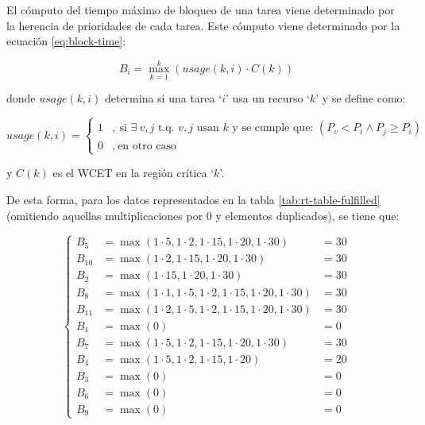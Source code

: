 El cómputo del tiempo máximo de bloqueo de una tarea viene determinado por la herencia
de prioridades de cada tarea. Este cómputo viene determinado por la ecuación \ref{eq:block-time}:

\begin{equation}\label{eq:block-time}
  B_i = \max_{k = 1}^k \left(usage\left(k, i\right) \cdot C\left(k\right)\right)
\end{equation}

donde $usage\left(k, i\right)$ determina si una tarea `$i$' usa un recurso `$k$'
y se define como:

\begin{equation*}
  usage\left(k, i\right) = \left\{
  \begin{aligned}
    1 & ,~\text{si $\exists~v,j$ t.q. $v,j$ usan $k$ y se cumple que: } \left(P_v < P_i \land P_j \ge P_i\right) \\
    0 & ,~\text{en otro caso}
  \end{aligned}
  \right.
\end{equation*}

y $C\left(k\right)$ es el \ac{WCET} en la región crítica `$k$'.

De esta forma, para los datos representados en la tabla \ref{tab:rt-table-fulfilled}
(omitiendo aquellas multiplicaciones por $0$ y elementos duplicados), se tiene que:

\begin{equation*}
  \left\{
  \begin{aligned}
    B_{5}  & = \max\left(1 \cdot 5, 1 \cdot 2, 1 \cdot 15, 1 \cdot 20, 1 \cdot 30\right)            & = 30 \\
    B_{10} & = \max\left(1 \cdot 2, 1 \cdot 15, 1 \cdot 20, 1 \cdot 30\right)                       & = 30 \\
    B_{2}  & = \max\left(1 \cdot 15, 1 \cdot 20, 1 \cdot 30\right)                                  & = 30 \\
    B_{8}  & = \max\left(1 \cdot 1, 1 \cdot 5, 1 \cdot 2, 1 \cdot 15, 1 \cdot 20, 1 \cdot 30\right) & = 30 \\
    B_{11} & = \max\left(1 \cdot 2, 1 \cdot 5, 1 \cdot 2, 1 \cdot 15, 1 \cdot 20, 1 \cdot 30\right) & = 30 \\
    B_{1}  & = \max\left(0\right)                                                                   & = 0  \\
    B_{7}  & = \max\left(1 \cdot 5, 1 \cdot 2, 1 \cdot 15, 1 \cdot 20, 1 \cdot 30\right)            & = 30 \\
    B_{4}  & = \max\left(1 \cdot 5, 1 \cdot 2, 1 \cdot 15, 1 \cdot 20\right)                        & = 20 \\
    B_{3}  & = \max\left(0\right)                                                                   & = 0  \\
    B_{6}  & = \max\left(0\right)                                                                   & = 0  \\
    B_{9}  & = \max\left(0\right)                                                                   & = 0
  \end{aligned}
  \right.
\end{equation*}

